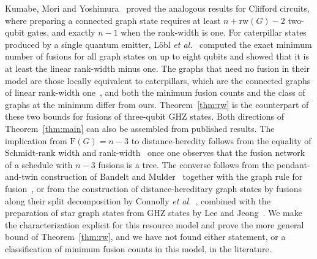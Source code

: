 \documentclass[aps,pra,onecolumn,superscriptaddress,nofootinbib,longbibliography]{revtex4-2}
\theoremstyle{plain}
\theoremstyle{remark}
\newcommand{\F}{\mathrm{F}}
\newcommand{\rw}{\mathrm{rw}}
\begin{document}
Kumabe, Mori and Yoshimura~\cite{Kumabe2026complexity} proved the analogous results for Clifford
circuits, where preparing a connected graph state requires at least $n+\rw(G)-2$ two-qubit gates, and
exactly $n-1$ when the rank-width is one. For caterpillar states produced by a single quantum emitter,
L\"obl \emph{et al.}~\cite{Lobl2025generating} computed the exact minimum number of fusions for all graph
states on up to eight qubits and showed that it is at least the linear rank-width minus one. The graphs
that need no fusion in their model are those locally equivalent to caterpillars, which are the connected
graphs of linear rank-width one~\cite{BuiXuan2013note}, and both the minimum fusion counts and the class
of graphs at the minimum differ from ours. Theorem~\ref{thm:rw} is the counterpart of these two bounds for
fusions of three-qubit GHZ states.
Both directions of Theorem~\ref{thm:main} can also be assembled from published results. The implication
from $\F(G)=n-3$ to distance-heredity follows from the equality of Schmidt-rank width and
rank-width~\cite{VandenNest2007classical} once one observes that the fusion network of a schedule with
$n-3$ fusions is a tree. The converse follows from the pendant-and-twin construction of Bandelt and
Mulder~\cite{Bandelt1986distance} together with the graph rule for fusion~\cite{Zaidi2015near,Lee2023graph},
or from the construction of distance-hereditary graph states by fusions along their split decomposition
by Connolly \emph{et al.}~\cite{Connolly2026efficient}, combined with the preparation of star graph states
from GHZ states by Lee and Jeong~\cite{Lee2023graph}. We make the characterization explicit for this
resource model and prove the more general bound of Theorem~\ref{thm:rw}, and we have not found either
statement, or a classification of minimum fusion counts in this model, in the literature.
\end{document}
